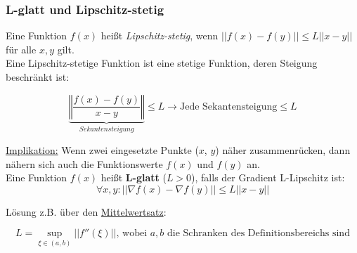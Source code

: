 \subsubsection{L-glatt und Lipschitz-stetig}

Eine Funktion \(f(x)\) heißt \emph{Lipschitz-stetig}, wenn \(||f(x) - f(y)|| \leq L ||x - y||\) für alle \(x, y\) gilt.\\

Eine Lipschitz-stetige Funktion ist eine stetige Funktion, deren Steigung beschränkt ist:

\begin{equation*}
    \underbrace{\left\Vert\frac{f(x)-f(y)}{x-y}\right\Vert}_{Sekantensteigung} \leq L \rightarrow \text{Jede Sekantensteigung} \leq L
\end{equation*}

\underline{Implikation:} Wenn zwei eingesetzte Punkte (\(x\), \(y\)) näher zusammenrücken, dann nähern sich auch die Funktionswerte \(f(x)\) und \(f(y)\) an.\\


Eine Funktion \(f(x)\) heißt \textbf{L-glatt} (\(L>0\)), falls der Gradient L-Lipschitz ist:
\begin{equation*}
    \forall x, y: ||\nabla f(x) - \nabla f(y)|| \leq L ||x - y||
\end{equation*}

Lösung z.B. über den \underline{Mittelwertsatz}:

\begin{equation*}
    L = \sup_{\xi \in (a,b)}||f''(\xi)||\text{, wobei } a, b \text{ die Schranken des Definitionsbereichs sind}
\end{equation*}
